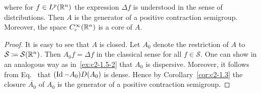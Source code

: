 \begin{examples}
\begin{enumerate}[\upshape (i), wide, labelindent=.25em]
\[\]
where for $f \in L^{p}(\mathbb{R}^{n})$ the expression $\Delta f$ is understood in the sense of distributions. Then $A$ is the generator of a positive contraction semigroup. Moreover, the space $C_{c}^{\infty}(\mathbb{R}^{n})$ is a core of\/ $A$.
\begin{proof}
It is easy to see that $A$ is closed. 
Let $A_{0}$ denote the restriction of\/ $A$ to $\mathcal{S} \coloneq \mathcal{S}(\mathbb{R}^{n})$. 
Then $A_{0}f = \Delta f$ in the classical sense for all $f \in \mathcal{S}$.
One can show in an analogous way as in~\ref{ex:c2-1.5-2}   that $A_{0}$ is dispersive. 
Moreover, it follows from Eq.~ that $(\operatorname{Id} - A_{0})D(A_{0})$ is dense. 
Hence by Corollary~\ref{cor:c2-1.3}   the closure $\overline{A_{0}}$ of\/ $A_{0}$ is the generator of a positive contraction semigroup.


\end{proof}
\end{enumerate}
\end{examples}
